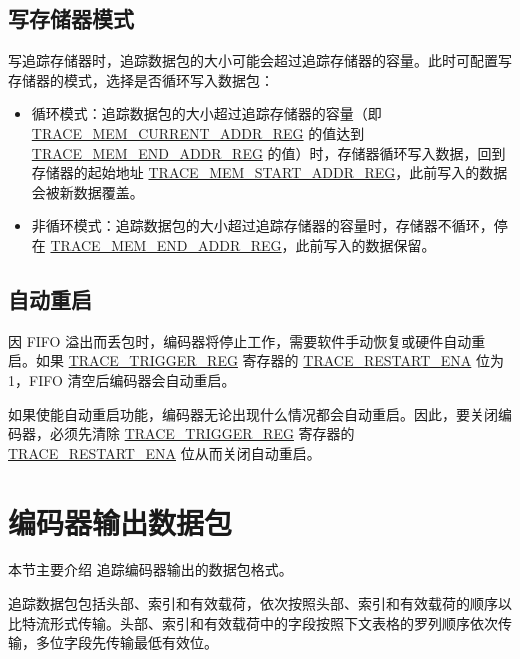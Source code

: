 \documentclass[main\_\_CN.tex]{subfiles}
\begin{document}
\subsection{写存储器模式}

写追踪存储器时，追踪数据包的大小可能会超过追踪存储器的容量。此时可配置写存储器的模式，选择是否循环写入数据包：

\begin{itemize}
    \item 循环模式：追踪数据包的大小超过追踪存储器的容量（即 \hyperref[regdesc:TRACEMEMCURRENTADDRREG]{TRACE\_MEM\_CURRENT\_ADDR\_REG} 的值达到 \hyperref[regdesc:TRACEMEMENDADDRREG]{TRACE\_MEM\_END\_ADDR\_REG} 的值）时，存储器循环写入数据，回到存储器的起始地址 \hyperref[regdesc:TRACEMEMSTARTADDRREG]{TRACE\_MEM\_START\_ADDR\_REG}，此前写入的数据会被新数据覆盖。
    \item 非循环模式：追踪数据包的大小超过追踪存储器的容量时，存储器不循环，停在 \hyperref[regdesc:TRACEMEMENDADDRREG]{TRACE\_MEM\_END\_ADDR\_REG}，此前写入的数据保留。
\end{itemize}

\subsection{自动重启}

因 FIFO 溢出而丢包时，编码器将停止工作，需要软件手动恢复或硬件自动重启。如果 \hyperref[regdesc:TRACETRIGGERREG]{TRACE\_TRIGGER\_REG} 寄存器的 \hyperref[fielddesc:TRACERESTARTENA]{TRACE\_RESTART\_ENA} 位为 1，FIFO 清空后编码器会自动重启。

如果使能自动重启功能，编码器无论出现什么情况都会自动重启。因此，要关闭编码器，必须先清除 \hyperref[regdesc:TRACETRIGGERREG]{TRACE\_TRIGGER\_REG} 寄存器的 \hyperref[fielddesc:TRACERESTARTENA]{TRACE\_RESTART\_ENA} 位从而关闭自动重启。


\section{编码器输出数据包}
\label{sec:riscvtracenc-packetes}

本节主要介绍 \chipname{} 追踪编码器输出的数据包格式。

追踪数据包包括头部、索引和有效载荷，依次按照头部、索引和有效载荷的顺序以比特流形式传输。头部、索引和有效载荷中的字段按照下文表格的罗列顺序依次传输，多位字段先传输最低有效位。
\end{document}

